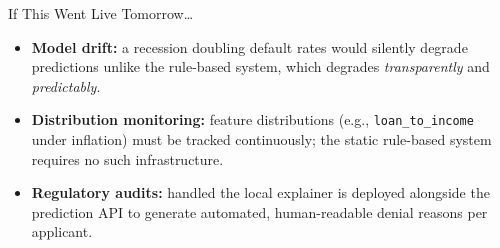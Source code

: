 \documentclass[aspectratio=169, 10pt]{beamer}
\begin{document}
\begin{frame}{If This Went Live Tomorrow\ldots}
 \begin{itemize}
 \item \textbf{Model drift:} a recession doubling default rates
 would silently degrade predictions unlike the rule-based
 system, which degrades \textit{transparently} and
 \textit{predictably}.
 \vspace{0.6em}
 \item \textbf{Distribution monitoring:} feature distributions
 (e.g., \texttt{loan\_to\_income} under inflation) must
 be tracked continuously; the static rule-based system
 requires no such infrastructure.
 \vspace{0.6em}
 \item \textbf{Regulatory audits:} handled the local explainer
 is deployed alongside the prediction API to generate
 automated, human-readable denial reasons per applicant.
 \end{itemize}
\end{frame}

\end{document}
